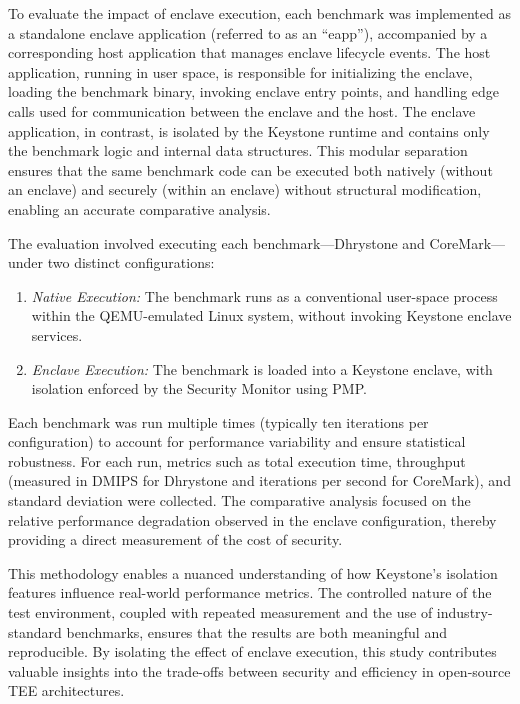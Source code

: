\documentclass[english, version-2020-11]{uzl-thesis}
\begin{document}
To evaluate the impact of enclave execution, each benchmark was implemented as a standalone enclave application (referred to as an “eapp”), accompanied by a corresponding host application that manages enclave lifecycle events. The host application, running in user space, is responsible for initializing the enclave, loading the benchmark binary, invoking enclave entry points, and handling edge calls used for communication between the enclave and the host. The enclave application, in contrast, is isolated by the Keystone runtime and contains only the benchmark logic and internal data structures. This modular separation ensures that the same benchmark code can be executed both natively (without an enclave) and securely (within an enclave) without structural modification, enabling an accurate comparative analysis.

The evaluation involved executing each benchmark—Dhrystone and CoreMark—under two distinct configurations:

\begin{enumerate}
\item \textit{Native Execution:} The benchmark runs as a conventional user-space process within the QEMU-emulated Linux system, without invoking Keystone enclave services.
\item \textit{Enclave Execution:} The benchmark is loaded into a Keystone enclave, with isolation enforced by the Security Monitor using PMP.
\end{enumerate}

Each benchmark was run multiple times (typically ten iterations per configuration) to account for performance variability and ensure statistical robustness. For each run, metrics such as total execution time, throughput (measured in DMIPS for Dhrystone and iterations per second for CoreMark), and standard deviation were collected. The comparative analysis focused on the relative performance degradation observed in the enclave configuration, thereby providing a direct measurement of the cost of security.

This methodology enables a nuanced understanding of how Keystone’s isolation features influence real-world performance metrics. The controlled nature of the test environment, coupled with repeated measurement and the use of industry-standard benchmarks, ensures that the results are both meaningful and reproducible. By isolating the effect of enclave execution, this study contributes valuable insights into the trade-offs between security and efficiency in open-source TEE architectures.

\end{document}
